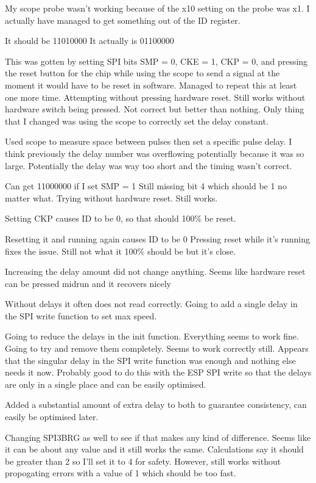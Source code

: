 My scope probe wasn't working because of the x10 setting on the probe was x1.
I actually have managed to get something out of the ID register.

It should be    11010000
It actually is  01100000

This was gotten by setting SPI bits SMP = 0, CKE = 1, CKP = 0, and pressing
the reset button for the chip while using the scope to send a signal at the moment it
would have to be reset in software.
Managed to repeat this at least one more time. Attempting without pressing hardware reset.
Still works without hardware switch being pressed. Not correct but better than nothing.
Only thing that I changed was using the scope to correctly set the delay constant.

Used scope to measure space between pulses then set a specific pulse delay.
I think previously the delay number was overflowing potentially because it was so large.
Potentially the delay was way too short and the timing wasn't correct.

Can get 11000000 if I set SMP = 1
Still missing bit 4 which should be 1 no matter what.
Trying without hardware reset. Still works.

Setting CKP causes ID to be 0, so that should 100\% be reset.

Resetting it and running again causes ID to be 0
Pressing reset while it's running fixes the issue.
Still not what it 100\% should be but it's close.

Increasing the delay amount did not change anything.
Seems like hardware reset can be pressed midrun and it recovers nicely

Without delays it often does not read correctly.
Going to add a single delay in the SPI write function to set max speed.

Going to reduce the delays in the init function. Everything seems to work fine.
Going to try and remove them completely. Seems to work correctly still.
Appears that the singular delay in the SPI write function was enough and nothing else
needs it now. Probably good to do this with the ESP SPI write so that the delays are
only in a single place and can be easily optimised.

Added a substantial amount of extra delay to both to guarantee consistency, can easily
be optimised later.

Changing SPI3BRG as well to see if that makes any kind of difference.
Seems like it can be about any value and it still works the same.
Calculations say it should be greater than 2 so I'll set it to 4 for safety.
However, still works without propogating errors with a value of 1 which
should be too fast.

